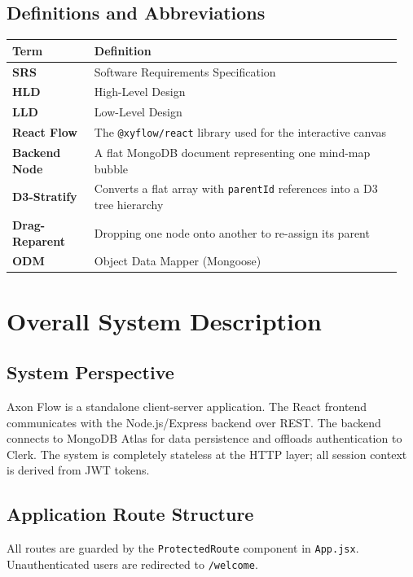 \documentclass[12pt, a4paper]{article}
\begin{document}
\subsection{Definitions and Abbreviations}
\begin{longtable}{>{\bfseries}p{0.2\linewidth} p{0.75\linewidth}}
\toprule
Term & Definition \\ \midrule
\endfirsthead
SRS & Software Requirements Specification \\
HLD & High-Level Design \\
LLD & Low-Level Design \\
React Flow & The \texttt{@xyflow/react} library used for the interactive canvas \\
Backend Node & A flat MongoDB document representing one mind-map bubble \\
D3-Stratify & Converts a flat array with \texttt{parentId} references into a D3 tree hierarchy \\
Drag-Reparent & Dropping one node onto another to re-assign its parent \\
ODM & Object Data Mapper (Mongoose) \\
\bottomrule
\end{longtable}

\section{Overall System Description}

\subsection{System Perspective}
Axon Flow is a standalone client-server application. The React frontend communicates with the Node.js/Express backend over REST. The backend connects to MongoDB Atlas for data persistence and offloads authentication to Clerk. The system is completely stateless at the HTTP layer; all session context is derived from JWT tokens.

\subsection{Application Route Structure}
All routes are guarded by the \texttt{ProtectedRoute} component in \texttt{App.jsx}. Unauthenticated users are redirected to \texttt{/welcome}.
\end{document}
